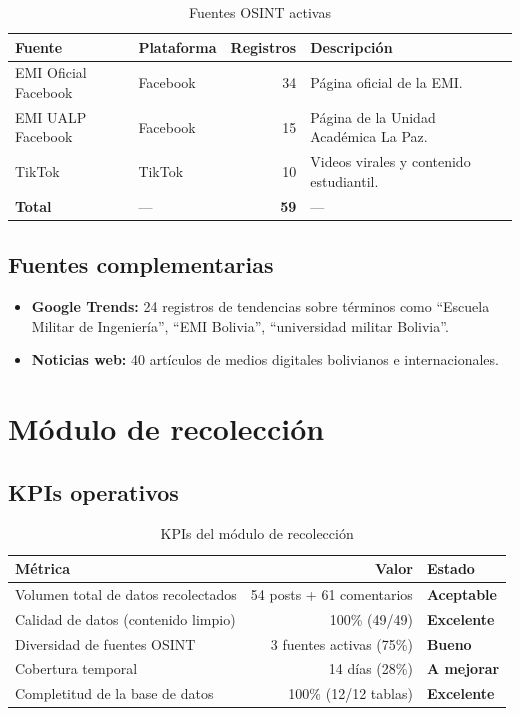 \documentclass[11pt,a4paper]{article}
\begin{document}
\begin{table}[H]
\centering
\begin{tabularx}{\textwidth}{l l r X}
\toprule
\textbf{Fuente} & \textbf{Plataforma} & \textbf{Registros} & \textbf{Descripción} \\
\midrule
EMI Oficial Facebook & Facebook & 34 & Página oficial de la EMI. \\
\rowcolor{tablerow}
EMI UALP Facebook & Facebook & 15 & Página de la Unidad Académica La Paz. \\
TikTok & TikTok & 10 & Videos virales y contenido estudiantil. \\
\midrule
\textbf{Total} & — & \textbf{59} & — \\
\bottomrule
\end{tabularx}
\caption{Fuentes OSINT activas}
\end{table}

\subsection{Fuentes complementarias}

\begin{itemize}
  \item \textbf{Google Trends:} 24 registros de tendencias sobre términos como ``Escuela Militar de Ingeniería'', ``EMI Bolivia'', ``universidad militar Bolivia''.
  \item \textbf{Noticias web:} 40 artículos de medios digitales bolivianos e internacionales.
\end{itemize}

\section{Módulo de recolección}

\subsection{KPIs operativos}

\begin{table}[H]
\centering
\begin{tabularx}{\textwidth}{X r l}
\toprule
\textbf{Métrica} & \textbf{Valor} & \textbf{Estado} \\
\midrule
Volumen total de datos recolectados & 54 posts + 61 comentarios & \textcolor{successgreen}{\textbf{Aceptable}} \\
\rowcolor{tablerow}
Calidad de datos (contenido limpio) & 100\% (49/49) & \textcolor{successgreen}{\textbf{Excelente}} \\
Diversidad de fuentes OSINT & 3 fuentes activas (75\%) & \textcolor{successgreen}{\textbf{Bueno}} \\
\rowcolor{tablerow}
Cobertura temporal & 14 días (28\%) & \textcolor{warningorange}{\textbf{A mejorar}} \\
Completitud de la base de datos & 100\% (12/12 tablas) & \textcolor{successgreen}{\textbf{Excelente}} \\
\bottomrule
\end{tabularx}
\caption{KPIs del módulo de recolección}
\end{table}
\end{document}
